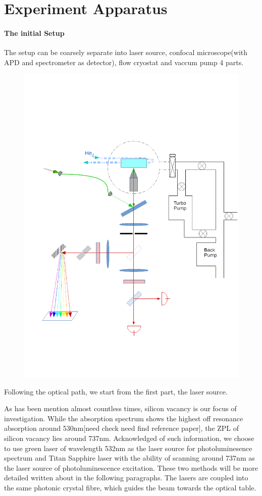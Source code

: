 \section[experiment apparatus]{Experiment Apparatus}

\paragraph{The initial Setup} 

The setup can be coarsely separate into laser source, confocal microscope(with APD and spectrometer as detector), flow cryostat and vaccum pump 4 parts.

\begin{figure}[h]
\centering
\includegraphics[width=0.7\linewidth]{Figures/pic/initialsetup}
\caption{}
\label{fig:initialsetup}
\end{figure}

Following the optical path, we start from the first part, the laser source.

As has been mention almost countless times, silicon vacancy is our focus of investigation. While the absorption spectrum shows the highest off resonance absorption around 530nm[need check need find reference paper], the ZPL of silicon vacancy lies around 737nm. Acknowledged of such information, we choose to use green laser of wavelength 532nm as the laser source for photoluminesence spectrum and Titan Sapphire laser with the ability of scanning around 737nm as the laser source of photoluminescence excitation. These two methods will be more detailed written about in the following paragraphs.
The lasers are coupled into the same photonic crystal fibre, which guides the beam towards the optical table.


